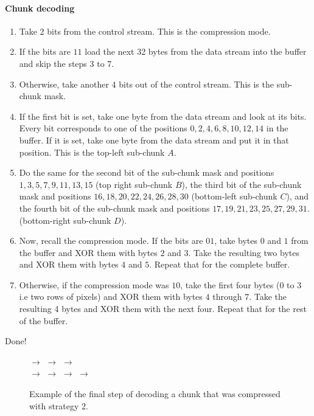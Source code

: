 \paragraph{Chunk decoding}

\begin{enumerate}
    \item Take 2 bits from the control stream. This is the compression mode.
    \item If the bits are $11$ load the next 32 \glspl{byte} from the data stream into the buffer and skip the steps 3 to 7.
    \item Otherwise, take another 4 bits out of the control stream. This is the sub-chunk mask.
    \item If the first bit is set, take one \gls{byte} from the data stream and look at its bits. Every bit corresponds to one of the positions $0, 2, 4, 6, 8, 10, 12, 14$ in the buffer. If it is set, take one \gls{byte} from the data stream and put it in that position. This is the top-left sub-chunk $A$.
    \item Do the same for the second bit of the sub-chunk mask and positions $1, 3, 5, 7, 9, 11, 13, 15$ (top right sub-chunk $B$), the third bit of the sub-chunk mask and positions $16, 18, 20, 22, 24, 26, 28, 30$ (bottom-left sub-chunk $C$), and the fourth bit of the sub-chunk mask and positions $17, 19, 21, 23, 25, 27, 29, 31$. (bottom-right sub-chunk $D$).
    \item Now, recall the compression mode. If the bits are $01$, take \glspl{byte} $0$ and $1$ from the buffer and XOR them with bytes $2$ and $3$. Take the resulting two bytes and XOR them with bytes $4$ and $5$. Repeat that for the complete buffer.
    \item Otherwise, if the compression mode was $10$, take the first four \glspl{byte} ($0$ to $3$ i.e two rows of pixels) and XOR them with \glspl{byte} $4$ through $7$. Take the resulting 4 bytes and XOR them with the next four. Repeat that for the rest of the buffer.
\end{enumerate}

Done!

\begin{figure}[h]
    \centering
    $\to$%
    $\to$%
    $\to$%
    \\[2mm]$\to$%
    $\to$%
    $\to$%
    $\to$%
    \caption{Example of the final step of decoding a chunk that was compressed with strategy 2. \label{fig:bimc_chunk_xor}}
\end{figure}


